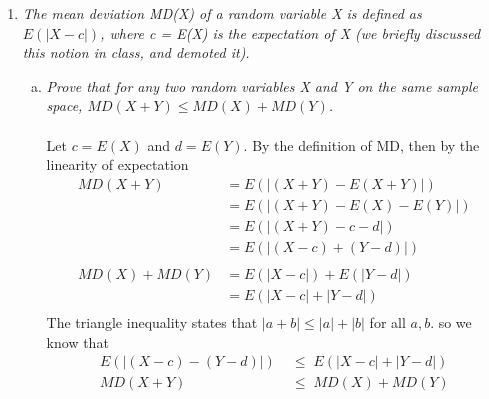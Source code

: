 \documentclass[a4paper]{article}
\begin{document}
\begin{enumerate}
\item\emph{The mean deviation MD(X) of a random variable X is defined as $E(|X-c|)$, where c = E(X) is the expectation of X (we briefly discussed this notion in class, and demoted it).}
	\begin{enumerate}[(a)]
	\item \emph{Prove that for any two random variables X and Y on the same sample space, $MD(X + Y) \leq MD(X) + MD(Y)$.} \\
    \\
    Let $c = E(X)$ and $d = E(Y)$. By the definition of MD, then by the linearity of expectation
    \begin{align*}
MD(X + Y) &= E(|(X+Y) - E(X+Y)|) \\ 
&= E(|(X+Y) - E(X)-E(Y)|) \\ 
&= E(|(X+Y) - c - d|) \\
&= E(|(X-c) + (Y -d)|) \\
\\
MD(X) + MD(Y) &= E(|X-c|)+ E(|Y-d|) \\
&= E(|X-c|+|Y-d|) \\
\end{align*}
The triangle inequality states that $|a+b| \leq |a|+|b|$ for all $a,b$. so we know that 
\begin{align*}
E(|(X-c) - (Y -d)|) \;&\leq\; E(|X-c|+|Y-d|) \\
MD(X+Y) \;&\leq\; MD(X) + MD(Y) \\
\end{align*}


\end{enumerate}
\end{enumerate}
\end{document}
